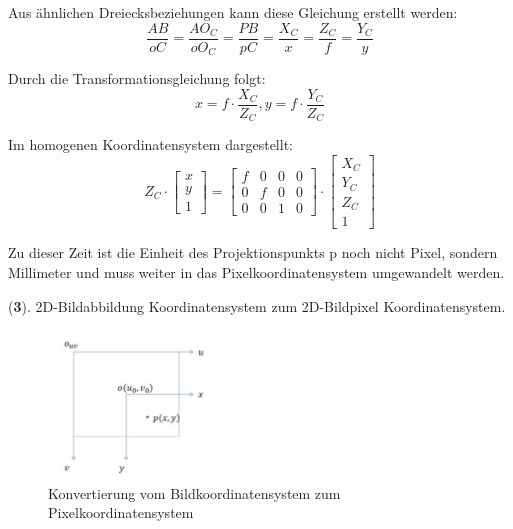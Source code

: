 Aus ähnlichen Dreiecksbeziehungen kann diese Gleichung erstellt werden:
\begin{equation}
   \frac{AB}{oC} = \frac{AO_C}{oO_C} = \frac{PB}{pC} = \frac{X_C}{x} = \frac{Z_C}{f} = \frac{Y_C}{y} 
\end{equation}

Durch die Transformationsgleichung folgt: 
\begin{equation}
   x = f \cdot \frac{X_C}{Z_C}, y = f \cdot \frac{Y_C}{Z_C}
\end{equation}

Im homogenen Koordinatensystem dargestellt:
\begin{equation}
   Z_C \cdot \begin{bmatrix}
	x \\  
	y \\
	1
	\end{bmatrix} = \begin{bmatrix}
	f & 0 & 0 & 0	\\
	0 & f & 0 & 0	\\
	0 & 0 & 1 & 0	
	\end{bmatrix} \cdot \begin{bmatrix}
	X_C \\  
	Y_C \\
	Z_C \\
	1
	\end{bmatrix}
\end{equation}

Zu dieser Zeit ist die Einheit des Projektionspunkts p noch nicht Pixel, sondern Millimeter und muss weiter in das Pixelkoordinatensystem umgewandelt werden.

(\textbf{3}). 2D-Bildabbildung Koordinatensystem zum 2D-Bildpixel Koordinatensystem.

\begin{figure}[H]
 \centering 
 \includegraphics[keepaspectratio,width=0.4\textwidth]{images/3_Ersteverfahren/Kamera/imagezupixel.pdf}
 \caption{Konvertierung vom Bildkoordinatensystem zum Pixelkoordinatensystem}
 \label{fig:Konvertierung von Pixelkoordinatensystem zu Bildkoordinatensystem}
\end{figure} 


